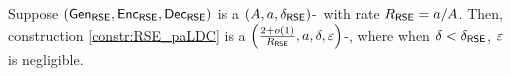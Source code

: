 \begin{theorem}\label{thm:RSE_paLDC}
    Suppose $(\mathsf{Gen}_{\mathsf{RSE}},\mathsf{Enc}_{\mathsf{RSE}},\mathsf{Dec}_{\mathsf{RSE}})$ is a $(A,a,\delta_{\mathsf{RSE}})$-\RSE\ with rate $R_{\mathsf{RSE}} = a / A$. 
    Then, construction \ref{constr:RSE_paLDC} is a ${\left(\frac{2 + o(1)}{R_{\mathsf{RSE}}},a,\delta,\varepsilon\right)}$-\paLDC, where when ${\delta < \delta_{\mathsf{RSE}}}$, $\varepsilon$ is negligible.
\end{theorem}